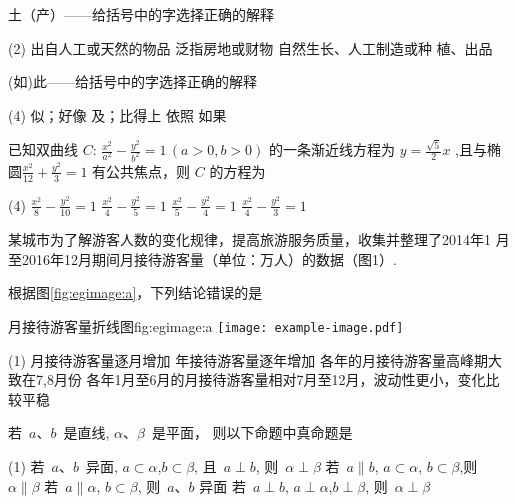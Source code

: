 

\begin{question}
土（产）——给括号中的字选择正确的解释 
  \begin{tasks}(2)
    \task 出自人工或天然的物品 \task 泛指房地或财物 \task 自然生长、人工制造或种
    植、出品
  \end{tasks}
\end{question}

\begin{question}
(如)此——给括号中的字选择正确的解释 
  \begin{tasks}(4)
    \task 似；好像 \task 及；比得上 \task 依照 \task 如果
  \end{tasks}
\end{question}

\begin{question}
已知双曲线 $C\colon\,\tfrac{x^2}{a^2}-\tfrac{y^2}{b^2}=1\,(a>0,b>0)$
  的一条渐近线方程为 $y=\tfrac{\sqrt{5}}{2}x$ ,且与椭
  圆$\tfrac{x^2}{12}+\tfrac{y^2}{3}=1$ 有公共焦点，则 $C$ 的方程为

  \begin{tasks}(4)
    \task $\tfrac{x^2}{8}-\tfrac{y^2}{10}=1$ \task $\tfrac{x^2}{4}-\tfrac{y^2}{5}=1$ \task $\tfrac{x^2}{5}-\tfrac{y^2}{4}=1$ \task $\tfrac{x^2}{4}-\tfrac{y^2}{3}=1$
  \end{tasks}
\end{question}

\begin{question}
某城市为了解游客人数的变化规律，提高旅游服务质量，收集并整理了2014年1
  月至2016年12月期间月接待游客量（单位：万人）的数据（图1）.

  根据图\ref{fig:egimage:a}，下列结论错误的是

  \begin{insertfig}{月接待游客量折线图}{fig:egimage:a}
    \texttt{[image: example-image.pdf]}
  \end{insertfig}%

  \begin{tasks}(1)
    \task 月接待游客量逐月增加
    \task 年接待游客量逐年增加
    \task 各年的月接待游客量高峰期大致在7,8月份
    \task 各年1月至6月的月接待游客量相对7月至12月，波动性更小，变化比较平稳
  \end{tasks}
\end{question}

\begin{question}
若~$a$、$b$~是直线, $\alpha$、$\beta$~是平面，
  则以下命题中真命题是

  \begin{tasks}(1)
    \task 若~$a$、$b$~异面, $a\subset\alpha$,$b\subset\beta$, 且~$a\perp b$, 则~$\alpha\perp\beta$
    \task 若~$a\parallel b$, $a\subset\alpha$, $b\subset\beta$,则~$\alpha\parallel\beta$
    \task 若~$a\parallel \alpha$, $b\subset\beta$, 则~$a$、$b$ 异面
    \task 若~$a\perp b$, $a\perp\alpha$,$b\perp\beta$, 则~$\alpha\perp\beta$
  \end{tasks}
\end{question}


